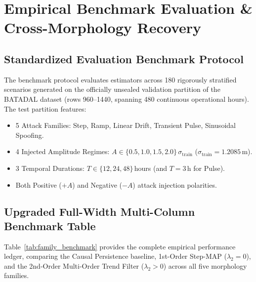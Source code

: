 \documentclass[11pt,a4paper]{article}
\begin{document}
\section{Empirical Benchmark Evaluation \& Cross-Morphology Recovery}

\subsection{Standardized Evaluation Benchmark Protocol}
The benchmark protocol evaluates estimators across 180 rigorously stratified scenarios generated on the officially unsealed validation partition of the BATADAL dataset (rows 960--1440, spanning 480 continuous operational hours). The test partition features:
\begin{itemize}
    \item 5 Attack Families: Step, Ramp, Linear Drift, Transient Pulse, Sinusoidal Spoofing.
    \item 4 Injected Amplitude Regimes: $A \in \{0.5, 1.0, 1.5, 2.0\}\,\sigma_{\text{train}}$ ($\sigma_{\text{train}} = 1.2085$\,m).
    \item 3 Temporal Durations: $T \in \{12, 24, 48\}$\,hours (and $T = 3$\,h for Pulse).
    \item Both Positive ($+A$) and Negative ($-A$) attack injection polarities.
\end{itemize}

\subsection{Upgraded Full-Width Multi-Column Benchmark Table}
Table~\ref{tab:family_benchmark} provides the complete empirical performance ledger, comparing the Causal Persistence baseline, 1st-Order Step-MAP ($\lambda_2 = 0$), and the 2nd-Order Multi-Order Trend Filter ($\lambda_2 > 0$) across all five morphology families.
\end{document}

